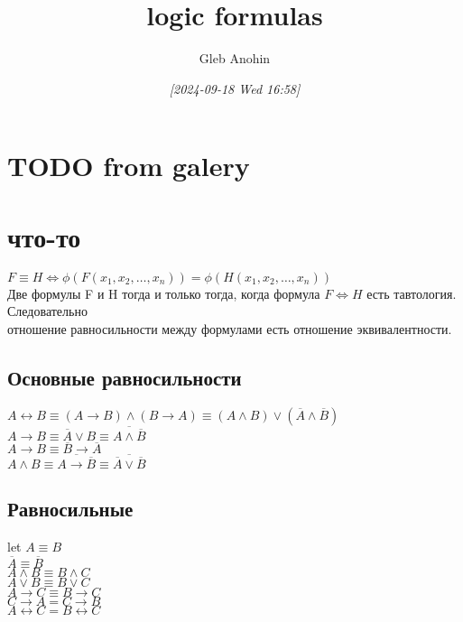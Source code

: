 \documentclass[letterpaper]{article}
\author{Gleb Anohin}
\date{\textit{{[}2024-09-18 Wed 16:58]}}
\title{logic formulas}
\begin{document}
\maketitle
\tableofcontents

\section{{\bfseries\sffamily TODO} from galery}
\label{sec:org8a43a05}
\section{что-то}
\label{sec:orgb8333d0}
\(F \equiv H \iff \phi(F(x_1, x_2, \ldots, x_n)) = \phi(H(x_1, x_2, \ldots, x_n))\)\\

Две формулы F и H тогда и только тогда, когда формула \(F \iff H\) есть тавтология.\\

Следовательно\\
отношение равносильности между формулами есть отношение эквивалентности.\\
\subsection{Основные равносильности}
\label{sec:org382a9ff}
\(A \leftrightarrow B \equiv (A \rightarrow B) \land (B \rightarrow A) \equiv (A \land B) \lor (\overline{A} \land \overline{B})\)\\
\(A \rightarrow B \equiv \overline{A} \lor B \equiv \overline{A \land \overline{B}}\)\\
\(A \rightarrow B \equiv \overline{B} \rightarrow \overline{A}\)\\
\(A \land B \equiv \overline{A \rightarrow \overline{B}} \equiv \overline{\overline{A}\lor \overline{B}}\)\\
\subsection{Равносильные}
\label{sec:orgfdc0f03}
let \(A \equiv B\)\\

\(\overline{A} \equiv \overline{B}\)\\
\(A \land B \equiv B \land C\)\\
\(A \lor B \equiv B \lor C\)\\

\(A \rightarrow C \equiv B \rightarrow C\)\\
\(C \rightarrow A = C \rightarrow B\)\\
\(A \leftrightarrow C = B \leftrightarrow C\)\\
\end{document}
